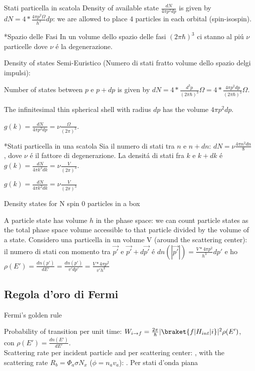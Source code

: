 \begin{frame}{Stati particella in scatola}
Density of available state $\frac{dN}{4\pi p^2dp}$ is given by $dN=4*\frac{4\pi p^2\Omega}{h^3}dp$: we are allowed to place 4 particles in each orbital (spin-isospin).

*Spazio delle Fasi
In un volume dello spazio delle fasi $(2\pi\hbar)^3$ ci stanno al pi\'u $\nu$ particelle dove $\nu$ \'e la degenerazione.

Density of states
Semi-Euristico (Numero di stati fratto volume dello spazio delgi impulsi):

Number of states between $p$ e $p+dp$ is given by $dN=4*\frac{d^3p}{(2\pi\hbar)^3}\Omega=4*\frac{4\pi p^2dp}{(2\pi\hbar)^3}\Omega$.

The infinitesimal thin spherical shell with radius $dp$ has the volume $4\pi p^2dp$.

$g(k)=\frac{dN}{4\pi p^2dp}=\nu\frac{\Omega}{(2\pi)^3}$.

*Stati particella in una scatola
Sia il numero di stati tra $n$ e $n+dn$: $dN=\nu \frac{4\pi n^2dn}{8}$, dove $\nu$ \'e il fattore di degenerazione. La densit\'a di stati fra $k$ e $k+dk$ \'e $g(k)=\frac{dN}{4\pi k^2dk}=\nu \frac{V}{(2\pi)^3}$.

$g(k)=\frac{dN}{4\pi k^2dk}=\nu \frac{V}{(2\pi)^3}$
    
\end{frame}

\begin{wordonframe}{ Density  states for N spin 0 particles in a box}
 
A particle state has volume $h$ in the phase space: we can count particle states as the total phase space volume accessible to that particle divided by the volume of a state. Considero una particella in un volume V (around the scattering center): il numero di stati con momento tra $\vec{p'}$ e $\vec{p'}+d\vec{p'}$ \'e $dn(|\vec{p'}|)=\frac{V*4\pi p^2}{h^3}dp'$ e ho $\rho(E')=\frac{dn(p')}{dE'}=\frac{dn(p')}{v'dp'}=\frac{V*4\pi p^2}{v' h^3}$


\end{wordonframe}

\subsection{Regola d'oro di Fermi}

\begin{frame}{Fermi's golden rule}
 
Probability of transition per unit time: $W_{i\rightarrow f}=\frac{2\pi}{\hbar}|\braket{f|H_{int}|i}|^2\rho(E')$, con $\rho(E')=\frac{dn(E')}{dE'}$.\\
Scattering rate per incident particle and per scattering center: , with the scattering rate $R_b=\Phi_a\sigma N_x$ ($\phi=n_av_a$): .
Per stati d'onda piana 
    
\end{frame}


